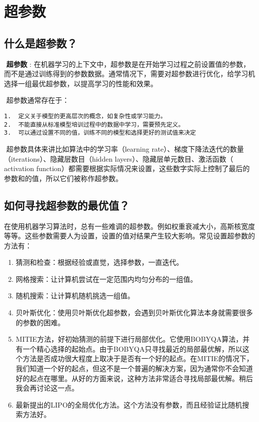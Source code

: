 \section{ 超参数}\label{ux8d85ux53c2ux6570}

\subsection{什么是超参数？}\label{ux4ec0ux4e48ux662fux8d85ux53c2ux6570}

​ \textbf{超参数} :
在机器学习的上下文中，超参数是在开始学习过程之前设置值的参数，而不是通过训练得到的参数数据。通常情况下，需要对超参数进行优化，给学习机选择一组最优超参数，以提高学习的性能和效果。

​ 超参数通常存在于：

\begin{verbatim}
1.  定义关于模型的更高层次的概念，如复杂性或学习能力。
2.  不能直接从标准模型培训过程中的数据中学习，需要预先定义。
3.  可以通过设置不同的值，训练不同的模型和选择更好的测试值来决定
\end{verbatim}

​ 超参数具体来讲比如算法中的学习率（learning
rate）、梯度下降法迭代的数量（iterations）、隐藏层数目（hidden
layers）、隐藏层单元数目、激活函数（ activation
function）都需要根据实际情况来设置，这些数字实际上控制了最后的参数和的值，所以它们被称作超参数。

\subsection{如何寻找超参数的最优值？}\label{ux5982ux4f55ux5bfbux627eux8d85ux53c2ux6570ux7684ux6700ux4f18ux503c}

​
在使用机器学习算法时，总有一些难调的超参数。例如权重衰减大小，高斯核宽度等等。这些参数需要人为设置，设置的值对结果产生较大影响。常见设置超参数的方法有：

\begin{enumerate}
\def\labelenumi{\arabic{enumi}.}
\item
  猜测和检查：根据经验或直觉，选择参数，一直迭代。
\item
  网格搜索：让计算机尝试在一定范围内均匀分布的一组值。
\item
  随机搜索：让计算机随机挑选一组值。
\item
  贝叶斯优化：使用贝叶斯优化超参数，会遇到贝叶斯优化算法本身就需要很多的参数的困难。
\item
  MITIE方法，好初始猜测的前提下进行局部优化。它使用BOBYQA算法，并有一个精心选择的起始点。由于BOBYQA只寻找最近的局部最优解，所以这个方法是否成功很大程度上取决于是否有一个好的起点。在MITIE的情况下，我们知道一个好的起点，但这不是一个普遍的解决方案，因为通常你不会知道好的起点在哪里。从好的方面来说，这种方法非常适合寻找局部最优解。稍后我会再讨论这一点。
\item
  最新提出的LIPO的全局优化方法。这个方法没有参数，而且经验证比随机搜索方法好。
\end{enumerate}

